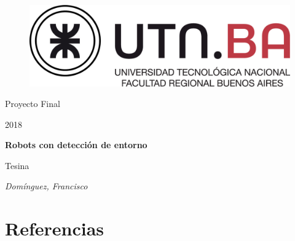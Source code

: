 \documentclass[a4paper,10pt]{article}
\numberwithin{equation}{section}
\begin{document}
\begin{titlepage}
\centering
\begin{figure}[t]
	\centering
	\includegraphics[scale=0.15]{utn.jpg}
    \vspace{0.5cm}
\end{figure}%
	{\LARGE Proyecto Final\par}
    {\LARGE 2018\par}
	\vspace{1cm}
	{\huge\bfseries Robots con detección de entorno\par}
	\vspace{1cm}
    {\LARGE Tesina\par}
    \vspace{1cm}
	{\Large\itshape Domínguez, Francisco\par}
	\vfill
\end{titlepage}


\tableofcontents

\newpage
\listoffigures
\newpage
\listoftables

\newpage


\newpage


\newpage


\newpage


\newpage


\newpage


\newpage


\newpage


\newpage


\newpage


\newpage


\newpage


\newpage
\section{Referencias}
\label{sec:6_refs}
\end{document}
